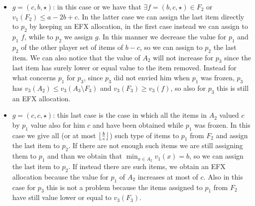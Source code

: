 \begin{itemize}
    \item $g = (c,b,\star)$: in this case or we have that $\exists f=(b,c,\star)\in F_2$ or $v_1(F_2) \le a-2b + c$. In the latter case we can assign the last item directly to $p_2$ by keeping an EFX allocation, in the first case instead we can assign to $p_1$ $f$, while to $p_2$ we assign $g$. In this manner we decrease the value for $p_1$ and $p_2$ of the other player set of items of $b-c$, so we can assign to $p_2$ the last item. We can also notice that the value of $A_2$ will not increase for $p_3$ since the last item has surely lower or equal value to the item removed. Instead for what concerns $p_1$ for $p_3$, since $p_3$ did not envied him when $p_1$ was frozen, $p_3$ has $v_3(A_2)\le v_3(A_3\setminus F_3)$ and $v_3(F_3)\ge v_3(f)$, so also for $p_3$ this is still an EFX allocation.
    \item $g = (c,c,\star)$: this last case is the case in which all the items in $A_2$ valued $c$ by $p_1$ value also for him $c$ and have been obtained while $p_1$ was frozen. In this case we give all (or at most $\left \lfloor\frac{b}{c}\right \rfloor$) such type of items to $p_1$ from $F_2$ and assign the last item to $p_2$. If there are not enough such items we are still assigning them to $p_1$ and than we obtain that $\min_{x \in A_2} v_1(x) = b $, so we can assign the last item to $p_2$. If instead there are such items, we obtain an EFX allocation because the value for $p_1$ of $A_2$ increases at most of $c$. Also in this case for $p_3$ this is not a problem because the items assigned to $p_1$ from $F_2$ have still value lower or equal to $v_3(F_3)$.
\end{itemize}
